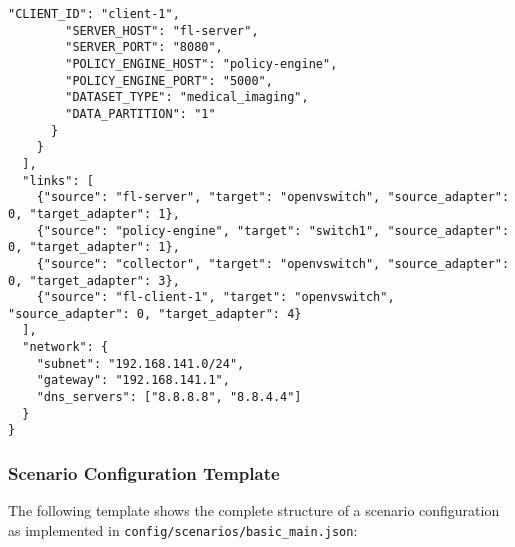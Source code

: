 \begin{lstlisting}[style=jsoncode, caption=Basic Topology Configuration Template]
        "CLIENT_ID": "client-1",
        "SERVER_HOST": "fl-server",
        "SERVER_PORT": "8080",
        "POLICY_ENGINE_HOST": "policy-engine",
        "POLICY_ENGINE_PORT": "5000",
        "DATASET_TYPE": "medical_imaging",
        "DATA_PARTITION": "1"
      }
    }
  ],
  "links": [
    {"source": "fl-server", "target": "openvswitch", "source_adapter": 0, "target_adapter": 1},
    {"source": "policy-engine", "target": "switch1", "source_adapter": 0, "target_adapter": 1},
    {"source": "collector", "target": "openvswitch", "source_adapter": 0, "target_adapter": 3},
    {"source": "fl-client-1", "target": "openvswitch", "source_adapter": 0, "target_adapter": 4}
  ],
  "network": {
    "subnet": "192.168.141.0/24",
    "gateway": "192.168.141.1",
    "dns_servers": ["8.8.8.8", "8.8.4.4"]
  }
}
\end{lstlisting}

\subsubsection{Scenario Configuration Template}

The following template shows the complete structure of a scenario configuration as implemented in \texttt{config/scenarios/basic\_main.json}:


